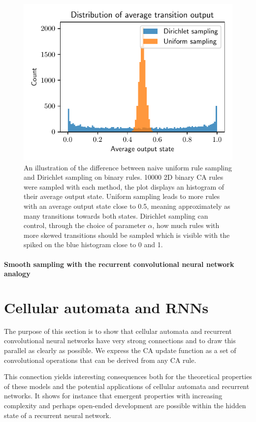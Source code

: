 \begin{figure}[htbp]
  \centering
  \includegraphics[width=.5\linewidth]{figures/ca_rule_sampling_hist}
  \caption{An illustration of the difference between naive uniform rule sampling
    and Dirichlet sampling on binary rules. 10000 2D binary CA rules were
    sampled with each method, the plot displays an histogram of their average
    output state. Uniform sampling leads to more rules with an average output
    state close to 0.5, meaning approximately as many transitions towards both
    states. Dirichlet sampling can control, through the choice of parameter $\alpha$,
    how much rules with more skewed transitions should be sampled which is
    visible with the spiked on the blue histogram close to 0 and 1.}
  \label{fig:ca_rule_sampling}
\end{figure}

\paragraph{Smooth sampling with the recurrent convolutional neural network
  analogy}


\section{Cellular automata and RNNs}\label{sec:cell-autom-rnns}
The purpose of this section is to show that cellular automata and recurrent
convolutional neural networks have very strong connections and to draw this
parallel as clearly as possible. We express the \ac{CA} update function as a set
of convolutional operations that can be derived from any \ac{CA} rule.

This connection yields interesting consequences both for the theoretical
properties of these models and the potential applications of cellular automata
and recurrent networks. It shows for instance that emergent properties with
increasing complexity and perhaps open-ended development are possible within the
hidden state of a recurrent neural network.

